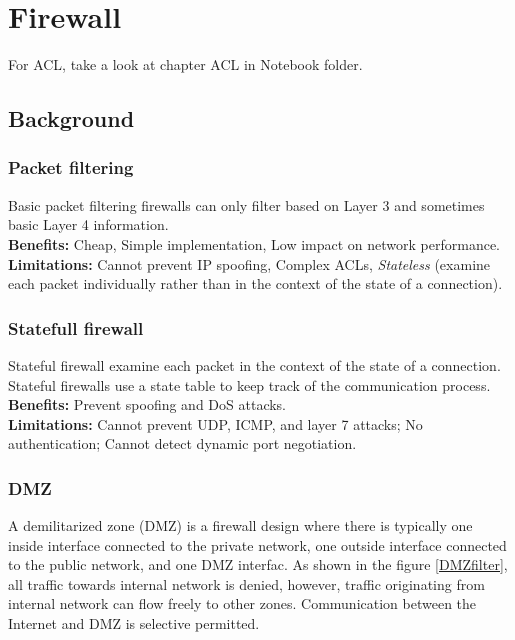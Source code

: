 \chapter{Firewall}

For ACL, take a look at chapter ACL in Notebook folder.\\

\section{Background}

\subsection{Packet filtering}

Basic packet filtering firewalls can only filter based on Layer 3 and sometimes basic Layer 4 information. \\

\textbf{Benefits:} Cheap, Simple implementation, Low impact on network performance.\\

\textbf{Limitations:} Cannot prevent IP spoofing, Complex ACLs, \emph{Stateless} (examine each packet individually rather than in the context of the state of a connection).

\subsection{Statefull firewall}

Stateful firewall examine each packet in the context of the state of a connection. Stateful firewalls use a state table to keep track of the communication process.\\ 

\textbf{Benefits:} Prevent spoofing and DoS attacks.\\ 

\textbf{Limitations:} Cannot prevent UDP, ICMP, and layer 7 attacks; No authentication; Cannot detect dynamic port negotiation.

\subsection{DMZ}

A demilitarized zone (DMZ) is a firewall design where there is typically one inside interface connected to the private network, one outside interface connected to the public network, and one DMZ interfac. As shown in the figure \ref{DMZfilter}, all traffic towards internal network is denied, however, traffic originating from internal network can flow freely to other zones. Communication between the Internet and DMZ is selective permitted.\\

